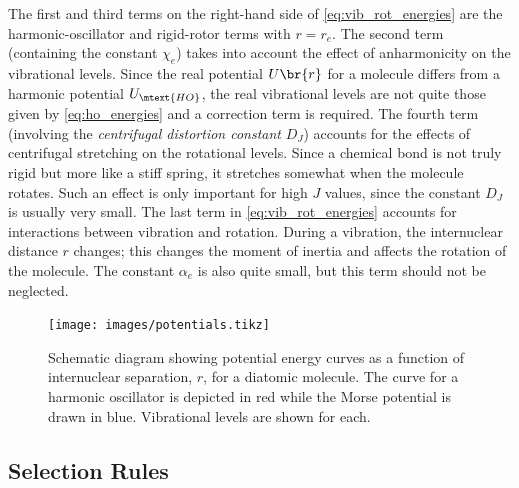 \documentclass[nobib,nofonts,nols,nohyper]{tufte-handout}
\begin{document}
The first and third terms on the right-hand side of \cref{eq:vib_rot_energies} are the harmonic-oscillator and rigid-rotor terms with \( r = r_e \).
The second term (containing the constant \( \chi_e \)) takes into account the effect of anharmonicity on the vibrational levels. 
Since the real potential \( U\br{r} \) for a molecule differs from a harmonic potential \( U_\mtext{HO} \), the real vibrational levels are not quite those given by \cref{eq:ho_energies} and a correction term is required. 
The fourth term (involving the \emph{centrifugal distortion constant} \( D_J \)) accounts for the effects of centrifugal stretching on the rotational levels. 
Since a chemical bond is not truly rigid but more like a stiff spring, it stretches somewhat when the molecule rotates. 
Such an effect is only important for high \( J \) values, since the constant \( D_J \) is usually very small. 
The last term in \cref{eq:vib_rot_energies} accounts for interactions between vibration and rotation. 
During a vibration, the internuclear distance \( r \) changes; this changes the moment of inertia and affects the rotation of the molecule. 
The constant \( \alpha_e \) is also quite small, but this term should not be neglected. 

\begin{figure}[htb]
  \centering
    \texttt{[image: images/potentials.tikz]}
  \caption{Schematic diagram showing potential energy curves as a function of internuclear separation, \( r \), for a diatomic molecule.
		The curve for a harmonic oscillator is depicted in red while the Morse potential is drawn in blue.
		Vibrational levels are shown for each.
	}
  \label{fig:potential_curves}
\end{figure}

\subsection{Selection Rules} %
\label{sub:selection_rules}
\end{document}
